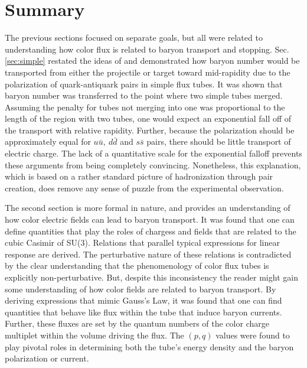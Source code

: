 \documentclass[aps, prc, 12pt, nofootinbib, showpacs, superscriptaddress, tightenlines, groupedaddress]{revtex4-2}
\begin{document}
\section{Summary}
The previous sections focused on separate goals, but all were related to understanding how color flux is related to baryon transport and stopping. Sec. \ref{sec:simple} restated the ideas of \cite{Vance:1997th} and demonstrated how baryon number would be transported from either the projectile or target toward mid-rapidity due to the polarization of quark-antiquark pairs in simple flux tubes. It was shown that baryon number was transferred to the point where two simple tubes merged. Assuming the penalty for tubes not merging into one was proportional to the length of the region with two tubes, one would expect an exponential fall off of the transport with relative rapidity. Further, because the polarization should be approximately equal for $u\bar{u},~d\bar{d}$ and $s\bar{s}$ pairs, there should be little transport of electric charge. The lack of a quantitative scale for the exponential falloff prevents these arguments from being completely convincing. Nonetheless, this explanation, which is based on a rather standard picture of hadronization through pair creation, does remove any sense of puzzle from the experimental observation.

The second section is more formal in nature, and provides an understanding of how color electric fields can lead to baryon transport. It was found that one can define quantities that play the roles of chargess and fields that are related to the cubic Casimir of SU(3). Relations that parallel typical expressions for linear response are derived. The perturbative nature of these relations is contradicted by the clear understanding that the phenomenology of color flux tubes is explicitly non-perturbative. But, despite this inconsistency the reader might gain some understanding of how color fields are related to baryon transport. By deriving expressions that mimic Gauss's Law, it was found that one can find quantities that behave like flux within the tube that induce baryon currents. Further, these fluxes are set by the quantum numbers of the color charge multiplet within the volume driving the flux. The $(p,q)$ values were found to play pivotal roles in determining both the tube's energy density and the baryon polarization or current.
\end{document}
